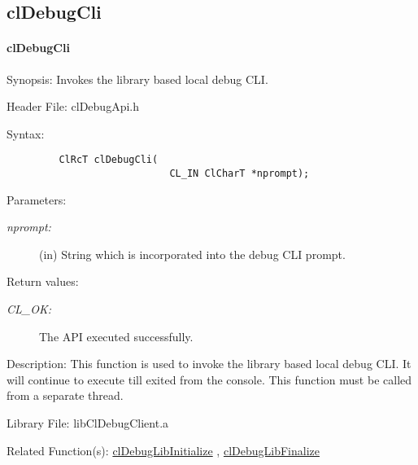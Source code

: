 \subsection{clDebugCli}
\hypertarget{pagedbg101}{}\paragraph{cl\-Debug\-Cli}\label{pagedbg101}
\begin{Desc}
\item[Synopsis:]Invokes the library based local debug CLI.\end{Desc}
\begin{Desc}
\item[Header File:]clDebugApi.h\end{Desc}
\begin{Desc}
\item[Syntax:]

\footnotesize\begin{verbatim}         ClRcT clDebugCli(
                            CL_IN ClCharT *nprompt);
\end{verbatim}
\normalsize
\end{Desc}
\begin{Desc}
\item[Parameters:]
\begin{description}
\item[{\em nprompt:}](in) String which is incorporated into the debug CLI prompt.\end{description}
\end{Desc}
\begin{Desc}
\item[Return values:]
\begin{description}
\item[{\em CL\_\-OK:}]The API executed successfully.\end{description}
\end{Desc}
\begin{Desc}
\item[Description:]This function is used to invoke the library based local debug CLI. It will continue to execute till exited from the console. This function must be called from a separate thread.\end{Desc}
\begin{Desc}
\item[Library File:]lib\-Cl\-Debug\-Client.a\end{Desc}
\begin{Desc}
\item[Related Function(s):]\hyperlink{pagedbg102}{cl\-Debug\-Lib\-Initialize} , \hyperlink{pagedbg103}{cl\-Debug\-Lib\-Finalize} \end{Desc}
\newpage


